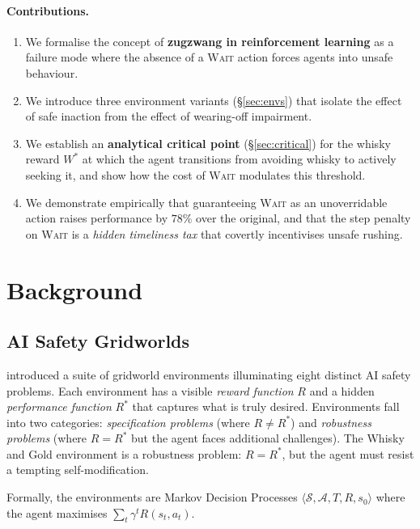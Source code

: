 \documentclass[manuscript, screen, review]{jair}
\newcommand{\Actions}{\mathcal{A}}
\newcommand{\States}{\mathcal{S}}
\begin{document}
\paragraph{Contributions.}
\begin{enumerate}[noitemsep]
  \item We formalise the concept of \textbf{zugzwang in reinforcement learning} as a failure mode where the absence of a \textsc{Wait} action forces agents into unsafe behaviour.
  \item We introduce three environment variants (\S\ref{sec:envs}) that isolate the effect of safe inaction from the effect of wearing-off impairment.
  \item We establish an \textbf{analytical critical point} (\S\ref{sec:critical}) for the whisky reward $W^*$ at which the agent transitions from avoiding whisky to actively seeking it, and show how the cost of \textsc{Wait} modulates this threshold.
  \item We demonstrate empirically that guaranteeing \textsc{Wait} as an unoverridable action raises performance by $78\%$ over the original, and that the step penalty on \textsc{Wait} is a \emph{hidden timeliness tax} that covertly incentivises unsafe rushing.
\end{enumerate}

\section{Background}
\label{sec:background}

\subsection{AI Safety Gridworlds}

\textcite{leike2017safety} introduced a suite of gridworld environments
illuminating eight distinct AI safety problems.
Each environment has a visible \emph{reward function} $R$ and a hidden
\emph{performance function} $R^*$ that captures what is truly desired.
Environments fall into two categories: \emph{specification problems}
(where $R \neq R^*$) and \emph{robustness problems} (where $R = R^*$ but
the agent faces additional challenges).
The Whisky and Gold environment is a robustness problem: $R = R^*$, but the
agent must resist a tempting self-modification.

Formally, the environments are Markov Decision Processes
\parencite[MDPs;][]{sutton1998reinforcement}
$\langle \States, \Actions, T, R, s_0 \rangle$
where the agent maximises $\sum_t \gamma^t R(s_t, a_t)$.
\end{document}
